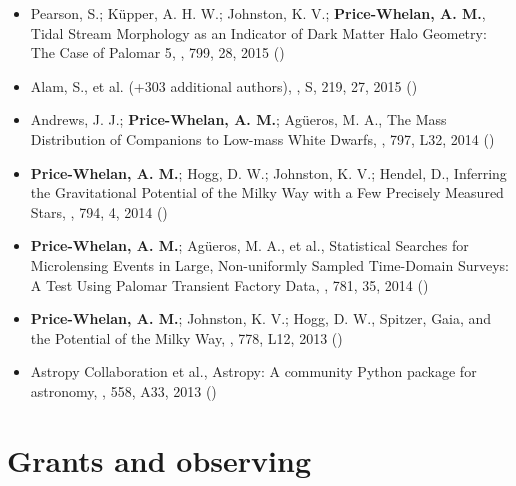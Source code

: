 \documentclass[12pt,letterpaper]{article}
\begin{document}
\begin{itemize}
\item Pearson, S.; K\"upper, A. H. W.; Johnston, K. V.; {\bf Price-Whelan, A. M.}, 
    {Tidal Stream Morphology as an Indicator of Dark Matter Halo Geometry: The Case of Palomar 5},
    \apj, 799, 28, 2015 ()

\item Alam, S., et al. (+303 additional authors), 
    ,
    \apj S, 219, 27, 2015 ()
    
\item Andrews, J. J.; {\bf Price-Whelan, A. M.}; Ag\"ueros, M. A., 
    {The Mass Distribution of Companions to Low-mass White Dwarfs},
    \apjl, 797, L32, 2014 ()

\item {\bf Price-Whelan, A. M.}; Hogg, D. W.; Johnston, K. V.; Hendel, D., 
    {Inferring the Gravitational Potential of the Milky Way with a Few Precisely Measured Stars},
    \apj, 794, 4, 2014 ()

\item {\bf Price-Whelan, A. M.}; Ag\"ueros, M. A., et al., 
    {Statistical Searches for Microlensing Events in Large, Non-uniformly Sampled Time-Domain Surveys: A Test Using Palomar Transient Factory Data},
    \apj, 781, 35, 2014 ()

\item {\bf Price-Whelan, A. M.}; Johnston, K. V.; Hogg, D. W., 
    {Spitzer, Gaia, and the Potential of the Milky Way},
    \apjl, 778, L12, 2013 ()

\item Astropy Collaboration et al., 
    {Astropy: A community Python package for astronomy},
    \aanda, 558, A33, 2013 ()

	\end{itemize}

\section*{Grants and observing }
\end{document}
